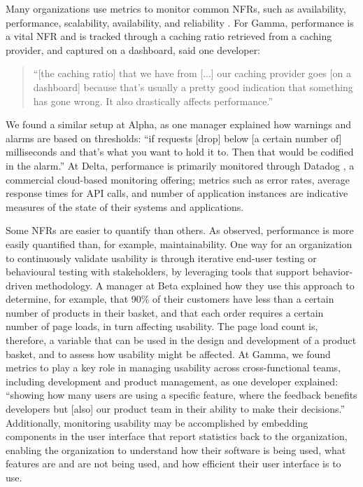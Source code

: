 \documentclass[smallextended]{svjour3}
\begin{document}
Many organizations use metrics to monitor common NFRs, such as availability, performance, scalability, availability, and reliability \citep{werner_tse_2021}.
For Gamma, performance is a vital NFR and is tracked through a caching ratio retrieved from a caching provider, and captured on a dashboard, said one developer:
\begin{quote}
``[the caching ratio] that we have from [...] our caching provider goes [on a dashboard] because that's usually a pretty good indication that something has gone wrong. It also drastically affects performance.''    
\end{quote}


\noindent We found a similar setup at Alpha, as one manager explained how warnings and alarms are based on thresholds:
\textmd{``if requests [drop] below [a certain number of] milliseconds and that's what you want to hold it to. Then that would be codified in the alarm.''}
At Delta, performance is primarily monitored through Datadog \citep{data_dog}, a commercial cloud-based monitoring offering; metrics such as error rates, average response times for API calls, and number of application instances are indicative measures of the state of their systems and applications. 

Some NFRs are easier to quantify than others. As \citet{wagner2019status} observed, performance is more easily quantified than, for example, maintainability.
One way for an organization to continuously validate usability is through iterative end-user testing or behavioural testing with stakeholders, by leveraging tools that support behavior-driven methodology. 
A manager at Beta explained how they use this approach to determine, for example, that 90\% of their customers have less than a certain number of products in their basket, and that each order requires a certain number of page loads, in turn affecting usability. The page load count is, therefore, a variable that can be used in the design and development of a product basket, and to assess how usability might be affected. 
At Gamma, we found metrics to play a key role in managing usability across cross-functional teams, including development and product management, as one developer explained:
\textmd{``showing how many users are using a specific feature, where the feedback benefits developers but [also] our product team in their ability to make their decisions.''}
Additionally, monitoring usability may be accomplished by embedding components in the user interface that report statistics back to the organization, enabling the organization to understand how their software is being used, what features are and are not being used, and how efficient their user interface is to use.
\end{document}
